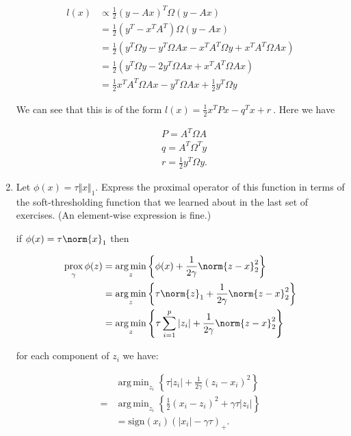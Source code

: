 \documentclass{article}
\DeclareMathOperator*{\argmin}{arg\,min}
\DeclareMathOperator*{\prox}{prox}
\begin{document}
\begin{enumerate}[label=(\Alph*)]
{\begin{align}
		l(x) &\propto \frac{1}{2}(y - Ax)^T \Omega (y - Ax) \\
		&= \frac{1}{2}(y^T - x^TA^T)\Omega (y - Ax) \\
		&= \frac{1}{2}(y^T\Omega y - y^T\Omega Ax - x^TA^T\Omega y + x^TA^T\Omega Ax) \\
		&= \frac{1}{2}(y^T\Omega y - 2 y^T\Omega Ax + x^TA^T\Omega Ax) \\
		&= \frac{1}{2}x^TA^T\Omega Ax - y^T\Omega Ax + \frac{1}{2}y^T\Omega y 
\end{align}

We can see that this is of the form $l(x) = \frac{1}{2} x^{T} P x - q^{T} x + r \ $. Here we have 

\begin{tcolorbox}
\begin{align}
&P = A^T\Omega A\\
&q = A^T \Omega^T y\\ 
&r = \frac{1}{2}y^T \Omega y.
\end{align}
\end{tcolorbox}

}



\item  Let $\phi(x) = \tau \Vert x \Vert_1$.  Express the proximal operator of this function in terms of the soft-thresholding function that we learned about in the last set of exercises.  (An element-wise expression is fine.)

{\color{blue}
if $\phi(x) = \tau \norm{x}_1$ then

\begin{align}
\prox_{\gamma} \phi(z) &= \argmin_z \left \{ \phi(x) + \frac{1}{2\gamma} \norm{z-x}_2^2 \right \} \\
&= \argmin_z \left \{ \tau\norm{z}_1 + \frac{1}{2\gamma} \norm{z-x}_2^2 \right \} \\
&= \argmin_z \left \{ \tau \sum_{i = 1}^p |z_i| + \frac{1}{2\gamma} \norm{z-x}_2^2 \right \}
\end{align}


for each component of $z_i$ we have:

\begin{align}
&\argmin_{z_i} \left \{ \tau |z_i| + \frac{1}{2\gamma} (z_i-x_i)^2 \right \}\\
= &\argmin_{z_i} \left \{ \frac{1}{2} (x_i - z_i)^2 + \gamma \tau |z_i|  \right \}\\
&=\text{sign}(x_i)(|x_i| - \gamma\tau)_+.
\end{align}

}
\end{enumerate}
\end{document}
